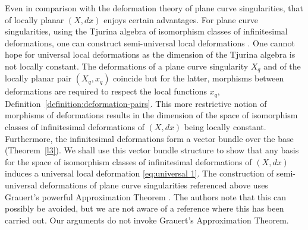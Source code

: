 \documentclass[11pt,twoside]{amsart}
\theoremstyle{plain}
\newcommand{\Tm}{\mathcal{T}}
\newcommand{\dfx}{dx}
\begin{document}
Even in comparison with the deformation theory of plane curve singularities, that of locally planar $ (X, \dfx) $ enjoys  certain advantages. For plane curve singularities, using the Tjurina algebra of isomorphism classes of infinitesimal deformations, one can construct   semi-universal local deformations \cite{dJP:00,GLS:07}. 
 One cannot hope for  universal local deformations  as the dimension of the Tjurina algebra is not locally constant. The deformations of a plane curve singularity $X_q $ and of the locally planar pair $(X_q, x_q) $ coincide but for the latter, morphisms between deformations are required to respect the local functions $x_q $, Definition~\ref{definition:deformation-pairs}. This more restrictive notion
of morphisms of deformations results in the dimension of the space of isomorphism classes of infinitesimal deformations of $ (X,\dfx) $ being locally constant. Furthermore, the infinitesimal deformations form a vector bundle over the base (Theorem~\ref {l3}). 
We shall use this vector bundle structure to show that any basis for the space of isomorphism classes of infinitesimal deformations of $ (X,\dfx) $ induces a universal local deformation \eqref {eq:universal 1}. %
The construction of semi-universal deformations of plane curve singularities referenced above uses Grauert's powerful Approximation Theorem \cite[Chapter 8.2]{dJP:00}. The authors note that this can possibly be avoided, but we are not aware of a reference where this has been carried out. Our arguments do not invoke Grauert's Approximation Theorem.

\end{document}
